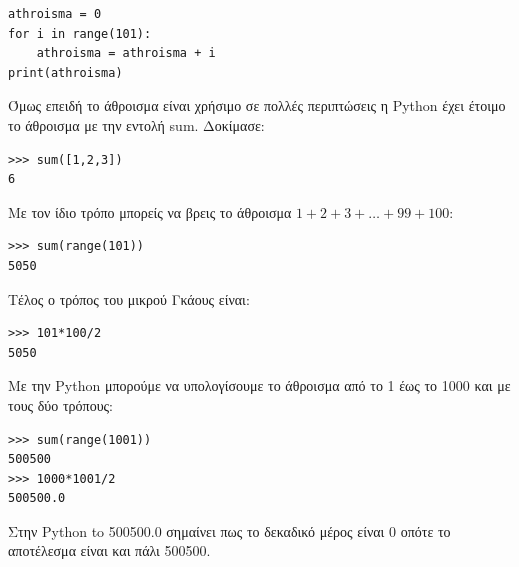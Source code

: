 \begin{lstlisting}
athroisma = 0
for i in range(101):
    athroisma = athroisma + i
print(athroisma)
\end{lstlisting}

Όμως επειδή το άθροισμα είναι χρήσιμο σε πολλές περιπτώσεις η Python έχει έτοιμο το άθροισμα με την εντολή sum. Δοκίμασε:
\begin{lstlisting}
>>> sum([1,2,3])
6
\end{lstlisting}

Με τον ίδιο τρόπο μπορείς να βρεις το άθροισμα $1 + 2 + 3+ \ldots + 99 + 100$:
\begin{lstlisting}
>>> sum(range(101))
5050
\end{lstlisting}

Τέλος ο τρόπος του μικρού Γκάους είναι:
\begin{lstlisting}
>>> 101*100/2
5050
\end{lstlisting}

Με την Python μπορούμε να υπολογίσουμε το άθροισμα από το 1 έως το 1000 και με τους δύο τρόπους:
\begin{lstlisting}
>>> sum(range(1001))
500500
>>> 1000*1001/2
500500.0
\end{lstlisting}
Στην Python to 500500.0 σημαίνει πως το δεκαδικό μέρος είναι 0 οπότε το αποτέλεσμα είναι και πάλι 500500.